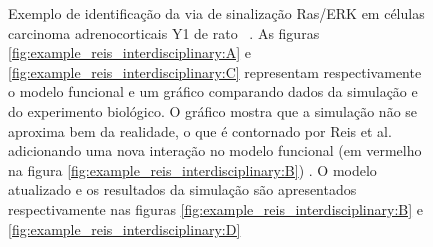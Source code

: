 \documentclass[12pt]{article}
\begin{document}
\begin{figure}[h]
    \centering

        
    \caption{Exemplo de identificação da via de sinalização Ras/ERK em
    células carcinoma adrenocorticais Y1 de rato 
    ~\cite{Reis2017interdisciplinary}. As figuras 
    \ref{fig:example_reis_interdisciplinary:A} e 
    \ref{fig:example_reis_interdisciplinary:C} representam 
    respectivamente o modelo funcional e um gráfico comparando dados da
    simulação e do experimento biológico. O gráfico mostra que a 
    simulação não se aproxima bem da realidade, o que é contornado por
    Reis et al. adicionando uma nova interação no modelo funcional 
    (em vermelho na figura \ref{fig:example_reis_interdisciplinary:B})
    . O modelo atualizado e os resultados da simulação são apresentados
    respectivamente nas figuras 
    \ref{fig:example_reis_interdisciplinary:B} e
    \ref{fig:example_reis_interdisciplinary:D}} 
    \label{fig:example_reis_interdisciplinary} 
\end{figure}
\FloatBarrier
\end{document}
